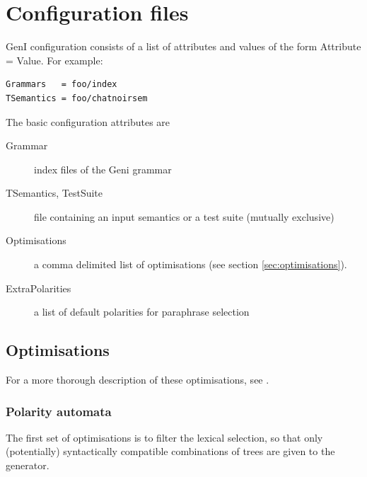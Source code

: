 \documentclass[11pt]{article}
\begin{document}
%
%

\section{Configuration files}
\label{sec:configuration_files}

GenI configuration consists of a list of
attributes and values of the form Attribute = Value.  For example: 

\begin{verbatim}
Grammars   = foo/index 
TSemantics = foo/chatnoirsem
\end{verbatim}

The basic configuration attributes are

\begin{description}
\item[Grammar]         index files of the Geni grammar
\item[TSemantics, TestSuite] file containing an input semantics or a
                             test suite (mutually exclusive)
\item[Optimisations]   a comma delimited list of optimisations (see
                       section \ref{sec:optimisations}).
\item[ExtraPolarities] a list of default polarities for paraphrase selection   
\end{description}

\subsection{Optimisations}

For a more thorough description of these optimisations, see
\cite{kow2003}.

\subsubsection{Polarity automata}

The first set of optimisations is to filter the lexical selection,
so that only (potentially) syntactically compatible combinations
of trees are given to the generator.  
\end{document}
